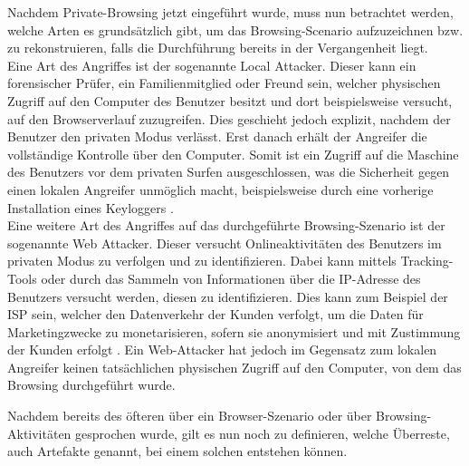 Nachdem Private-Browsing jetzt eingeführt wurde, muss nun betrachtet werden, welche Arten es grundsätzlich gibt, um das Browsing-Scenario aufzuzeichnen bzw. zu rekonstruieren, falls die Durchführung bereits in der Vergangenheit liegt.\\
Eine Art des Angriffes ist der sogenannte \glqq{}Local Attacker\grqq{}. Dieser kann ein forensischer Prüfer, ein Familienmitglied oder Freund sein, welcher physischen Zugriff auf den Computer des Benutzer besitzt und dort beispielsweise versucht, auf den Browserverlauf zuzugreifen. Dies geschieht jedoch explizit, nachdem der Benutzer den privaten Modus verlässt. Erst danach erhält der Angreifer die vollständige Kontrolle über den Computer. Somit ist ein Zugriff auf die Maschine des Benutzers vor dem privaten Surfen ausgeschlossen, was die Sicherheit gegen einen lokalen Angreifer unmöglich macht, beispielsweise durch eine vorherige Installation eines Keyloggers \cite{Aggarwal.2010}.\\
Eine weitere Art des Angriffes auf das durchgeführte Browsing-Szenario ist der sogenannte \glqq{}Web Attacker\grqq{}. Dieser versucht Onlineaktivitäten des Benutzers im privaten Modus zu verfolgen und zu identifizieren. Dabei kann mittels Tracking-Tools oder durch das Sammeln von Informationen über die IP-Adresse des Benutzers versucht werden, diesen zu identifizieren. Dies kann zum Beispiel der ISP sein, welcher den Datenverkehr der Kunden verfolgt, um die Daten für Marketingzwecke zu monetarisieren, sofern sie anonymisiert und mit Zustimmung der Kunden erfolgt \cite{Aggarwal.2010}. Ein Web-Attacker hat jedoch im Gegensatz zum lokalen Angreifer keinen tatsächlichen physischen Zugriff auf den Computer, von dem das Browsing durchgeführt wurde.

Nachdem bereits des öfteren über ein Browser-Szenario oder über Browsing-Aktivitäten gesprochen wurde, gilt es nun noch zu definieren, welche Überreste, auch Artefakte genannt, bei einem solchen entstehen können.

